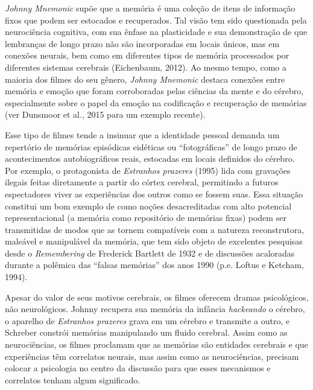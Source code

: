 \emph{Johnny Mnemonic} supõe que a memória é uma coleção de itens de
informação fixos que podem ser estocados e recuperados. Tal visão tem
sido questionada pela neurociência cognitiva, com sua ênfase na
plasticidade e sua demonstração de que lembranças de longo prazo não são
incorporadas em locais únicos, mas em conexões neurais, bem como em
diferentes tipos de memória processados por diferentes sistemas
cerebrais (Eichenbaum, 2012). Ao mesmo tempo, como a maioria dos filmes
do seu gênero, \emph{Johnny Mnemonic} destaca conexões entre memória e
emoção que foram corroboradas pelas ciências da mente e do cérebro,
especialmente sobre o papel da emoção na codificação e recuperação de
memórias (ver Dunsmoor et al., 2015 para um exemplo recente).

Esse tipo de filmes tende a insinuar que a identidade pessoal demanda um
repertório de memórias episódicas eidéticas ou ``fotográficas'' de longo
prazo de acontecimentos autobiográficos reais, estocadas em locais
definidos do cérebro. Por exemplo, o protagonista de \emph{Estranhos
prazeres} (1995) lida com gravações ilegais feitas diretamente a partir
do córtex cerebral, permitindo a futuros espectadores viver as
experiências dos outros como se fossem suas. Essa situação constitui um
bom exemplo de como noções desacreditadas com alto potencial
representacional (a memória como repositório de memórias fixas) podem
ser transmitidas de modos que as tornem compatíveis com a natureza
reconstrutora, maleável e manipulável da memória, que tem sido objeto de
excelentes pesquisas desde o \emph{Remembering} de Frederick Bartlett de
1932 e de discussões acaloradas durante a polêmica das ``falsas
memórias'' dos anos 1990 (p.e. Loftus e Ketcham, 1994).

Apesar do valor de seus motivos cerebrais, os filmes oferecem dramas
psicológicos, não neurológicos. Johnny recupera sua memória da infância
\emph{hackeando} o cérebro, o aparelho de \emph{Estranhos prazeres}
grava em um cérebro e transmite a outro, e Schreber constrói memórias
manipulando um fluido cerebral. Assim como as neurociências, os filmes
proclamam que as memórias são entidades cerebrais e que experiências têm
correlatos neurais, mas assim como as neurociências, precisam colocar a
psicologia no centro da discussão para que esses mecanismos e correlatos
tenham algum significado.

